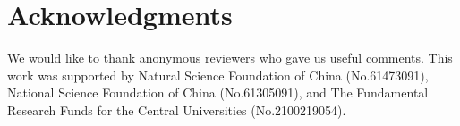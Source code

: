 \documentclass[runningheads]{llncs}
\begin{document}
\section*{Acknowledgments}
We would like to thank anonymous reviewers who gave
us useful comments. This work was supported by Natural
Science Foundation of China (No.61473091), National Science Foundation of China (No.61305091), and The Fundamental Research Funds for the Central Universities (No.2100219054).



\end{document}
